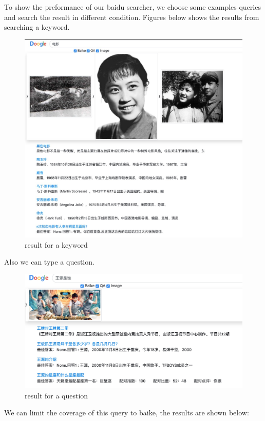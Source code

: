 \documentclass[10pt,times,twocolumn]{article}
\begin{document}
To show the preformance of our baidu searcher, we choose some examples queries and search the result in different condition. 
\newline
Figures below shows the results from searching a keyword.
\begin{figure}[ht]
\centering
\includegraphics[scale=0.2]{fig/6}
\caption{result for a keyword}
\label{fig:label}
\end{figure}
\newline
Also we can type a question.
\begin{figure}[ht]
\centering
\includegraphics[scale=0.13]{fig/7}
\caption{result for a question}
\label{fig:label}
\end{figure}
\newline
We can limit the coverage of this query to baike, the results are shown below:
\end{document}
